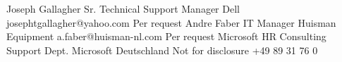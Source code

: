 %
%
%


\begin{referees}
		{Joseph Gallagher}
		{Sr. Technical Support Manager}
		{Dell}
		{josephtgallagher@yahoo.com}
		{Per request}
		{Andre Faber}
		{IT Manager}
		{Huisman Equipment}
		{a.faber@huisman-nl.com}
		{Per request}
		{Microsoft HR Consulting}
		{Support Dept.}
		{Microsoft Deutschland}
		{Not for disclosure}
		{+49 89 31 76 0}
		
\end{referees}
